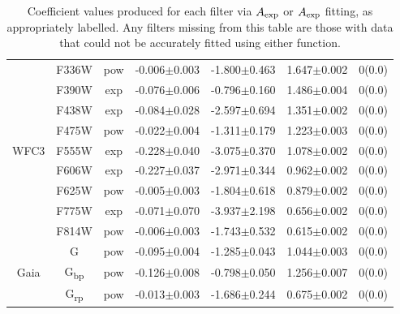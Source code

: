 \documentclass[12pt, a4paper]{report}
\begin{document}
\begin{table}
\begin{center}
\begin{tabular}{ccccccc}
& F336W & pow & -0.006$\pm$0.003 & -1.800$\pm$0.463 & 1.647$\pm$0.002 & 0(0.0) \\
& F390W & exp & -0.076$\pm$0.006 & -0.796$\pm$0.160 & 1.486$\pm$0.004 & 0(0.0) \\
& F438W & exp & -0.084$\pm$0.028 & -2.597$\pm$0.694 & 1.351$\pm$0.002 & 0(0.0) \\
& F475W & pow & -0.022$\pm$0.004 & -1.311$\pm$0.179 & 1.223$\pm$0.003 & 0(0.0) \\
WFC3 & F555W & exp & -0.228$\pm$0.040 & -3.075$\pm$0.370 & 1.078$\pm$0.002 & 0(0.0) \\
& F606W & exp & -0.227$\pm$0.037 & -2.971$\pm$0.344 & 0.962$\pm$0.002 & 0(0.0) \\
& F625W & pow & -0.005$\pm$0.003 & -1.804$\pm$0.618 & 0.879$\pm$0.002 & 0(0.0) \\
& F775W & exp & -0.071$\pm$0.070 & -3.937$\pm$2.198 & 0.656$\pm$0.002 & 0(0.0) \\
& F814W & pow & -0.006$\pm$0.003 & -1.743$\pm$0.532 & 0.615$\pm$0.002 & 0(0.0) \\ \hline

& G & pow & -0.095$\pm$0.004 & -1.285$\pm$0.043 & 1.044$\pm$0.003 & 0(0.0) \\
Gaia & G\textsubscript{bp} & pow & -0.126$\pm$0.008 & -0.798$\pm$0.050 & 1.256$\pm$0.007 & 0(0.0) \\
& G\textsubscript{rp} & pow & -0.013$\pm$0.003 & -1.686$\pm$0.244 & 0.675$\pm$0.002 & 0(0.0) \\ \hline

\end{tabular}
\caption{Coefficient values produced for each filter via $A_{\textnormal{exp}}$ or $A_{\textnormal{exp}}$ fitting, as appropriately labelled. Any filters missing from this table are those with data that could not be accurately fitted using either function.}
\label{simpfunc_coeffs_table}
\end{center}
\end{table}
\end{document}
